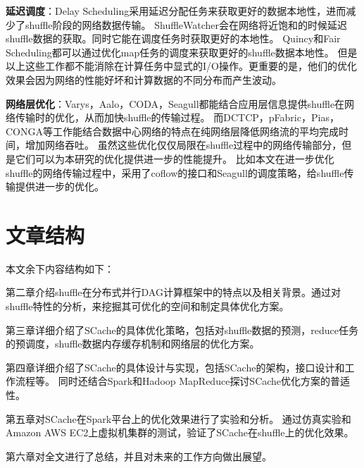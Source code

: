 \textbf{延迟调度}：Delay Scheduling\cite{delay}采用延迟分配任务来获取更好的数据本地性，进而减少了shuffle阶段的网络数据传输。
ShuffleWatcher\cite{shufflewatcher}会在网络将近饱和的时候延迟shuffle数据的获取。同时它能在调度任务时获取更好的本地性。
Quincy\cite{quincy}和Fair Scheduling\cite{preemptive}都可以通过优化map任务的调度来获取更好的shuffle数据本地性。
但是以上这些工作都不能消除在计算任务中显式的I/O操作。更重要的是，他们的优化效果会因为网络的性能好坏和计算数据的不同分布而产生波动。

\textbf{网络层优化}：Varys\cite{varys}，Aalo\cite{aalo}，CODA\cite{coda}，Seagull\cite{seagull}都能结合应用层信息提供shuffle在网络传输时的优化，从而加快shuffle的传输过程。
而DCTCP\cite{dctcp}，pFabric\cite{pfabric}，Pias\cite{pias}，CONGA\cite{conga}等工作能结合数据中心网络的特点在纯网络层降低网络流的平均完成时间，增加网络吞吐。
虽然这些优化仅仅局限在shuffle过程中的网络传输部分，但是它们可以为本研究的优化提供进一步的性能提升。
比如本文在进一步优化shuffle的网络传输过程中，采用了coflow\cite{coflow}的接口和Seagull的调度策略，给shuffle传输提供进一步的优化。

\section{文章结构}

本文余下内容结构如下：

第二章介绍shuffle在分布式并行DAG计算框架中的特点以及相关背景。通过对shuffle特性的分析，来挖掘其可优化的空间和制定具体优化方案。

第三章详细介绍了SCache的具体优化策略，包括对shuffle数据的预测，reduce任务的预调度，shuffle数据内存缓存机制和网络层的优化方案。

第四章详细介绍了SCache的具体设计与实现，包括SCache的架构，接口设计和工作流程等。
同时还结合Spark\cite{apachespark}和Hadoop MapReduce\cite{hadoop}探讨SCache优化方案的普适性。

第五章对SCache在Spark\cite{apachespark}平台上的优化效果进行了实验和分析。
通过仿真实验和Amazon AWS EC2上虚拟机集群的测试，验证了SCache在shuffle上的优化效果。

第六章对全文进行了总结，并且对未来的工作方向做出展望。







